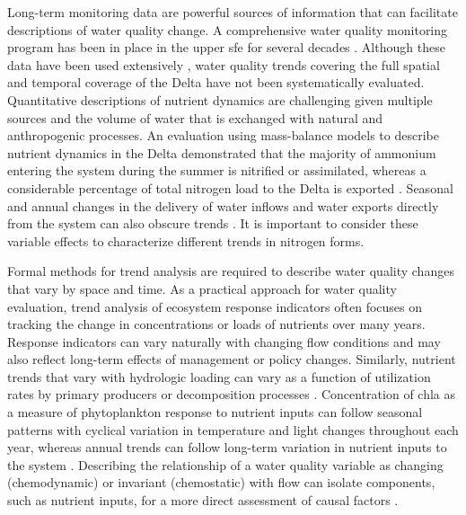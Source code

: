 \documentclass[letterpaper,12pt,oneside]{article}\usepackage[]{graphicx}\usepackage[]{color}
\begin{document}
Long-term monitoring data are powerful sources of information that can facilitate descriptions of water quality change. A comprehensive water quality monitoring program has been in place in the upper \ac{sfe} for several decades \citep[\cref{fig:delt_map},][]{IEP13}.  Although these data have been used extensively \citep[e.g.,][]{Lehman92,Jassby08,Glibert10}, water quality trends covering the full spatial and temporal coverage of the Delta have not been systematically evaluated. Quantitative descriptions of nutrient dynamics are challenging given multiple sources and the volume of water that is exchanged with natural and anthropogenic processes.  An evaluation using mass-balance models to describe nutrient dynamics in the Delta demonstrated that the majority of ammonium entering the system during the summer is nitrified or assimilated, whereas a considerable percentage of total nitrogen load to the Delta is exported \citep{Novick15}. Seasonal and annual changes in the delivery of water inflows and water exports directly from the system can also obscure trends \citep{Jassby00,Jassby08}. It is important to consider these variable effects to characterize different trends in nitrogen forms.

Formal methods for trend analysis are required to describe water quality changes that vary by space and time. As a practical approach for water quality evaluation, trend analysis of ecosystem response indicators often focuses on tracking the change in concentrations or loads of nutrients over many years. Response indicators can vary naturally with changing flow conditions and may also reflect long-term effects of management or policy changes. Similarly, nutrient trends that vary with hydrologic loading can vary as a function of utilization rates by primary producers or decomposition processes \citep{Sakamoto89,Schultz08,Harding16}.  Concentration of \ac{chla} as a measure of phytoplankton response to nutrient inputs can follow seasonal patterns with cyclical variation in temperature and light changes throughout each year, whereas annual trends can follow long-term variation in nutrient inputs to the system \citep{Cloern96,Cloern10}.  Describing the relationship of a water quality variable as changing (chemodynamic) or invariant (chemostatic) with flow can isolate components, such as nutrient inputs, for a more direct assessment of causal factors \citep{Wan17}.  
\end{document}
